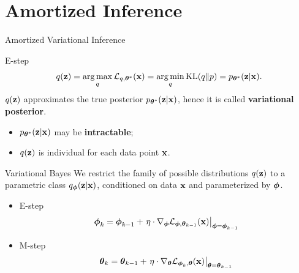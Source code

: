 \documentclass{beamer}
\begin{document}
\section{Amortized Inference}
\begin{frame}{Amortized Variational Inference}
	\begin{block}{E-step}
		\vspace{-0.3cm}
		\[
			q(\mathbf{z}) = \operatorname*{arg\,max}_q \mathcal{L}_{q, \boldsymbol{\theta}^*}(\mathbf{x}) = \operatorname*{arg\,min}_q \mathrm{KL}(q \| p) =
		p_{\boldsymbol{\theta}^*}(\mathbf{z}| \mathbf{x}).
		\]
		\eqpause
		$q(\mathbf{z})$ approximates the true posterior $p_{\boldsymbol{\theta}^*}(\mathbf{z}| \mathbf{x})$, hence it is called \textbf{variational posterior}.				
		\eqpause
		\begin{itemize}
			\item {\color{violet}$p_{\boldsymbol{\theta}^*}(\mathbf{z}| \mathbf{x})$ may be \textbf{intractable}};
			\item {\color{teal}$q(\mathbf{z})$ is individual for each data point $\mathbf{x}$}.
		\end{itemize}
	\end{block}
	\eqpause
	\begin{block}{Variational Bayes}
		We restrict the family of possible distributions $q(\mathbf{z})$ to a parametric class $q_{\boldsymbol{\phi}}(\mathbf{z}| \mathbf{x})$, {\color{teal}conditioned on data $\mathbf{x}$} and {\color{violet}parameterized by $\boldsymbol{\phi}$}.
		\eqpause
		\begin{itemize}
			\item E-step
			\[
				\boldsymbol{\phi}_k = \boldsymbol{\phi}_{k-1} + \left.\eta \cdot \nabla_{\boldsymbol{\phi}} \mathcal{L}_{\boldsymbol{\phi}, \boldsymbol{\theta}_{k-1}}(\mathbf{x})\right|_{\boldsymbol{\phi}=\boldsymbol{\phi}_{k-1}}
			\]
			\item M-step
			\[
				\boldsymbol{\theta}_k = \boldsymbol{\theta}_{k-1} + \left.\eta \cdot \nabla_{\boldsymbol{\theta}} \mathcal{L}_{\boldsymbol{\phi}_k, \boldsymbol{\theta}}(\mathbf{x})\right|_{\boldsymbol{\theta}=\boldsymbol{\theta}_{k-1}}
			\]
		\end{itemize}
	\end{block}
\end{frame}
\end{document}

